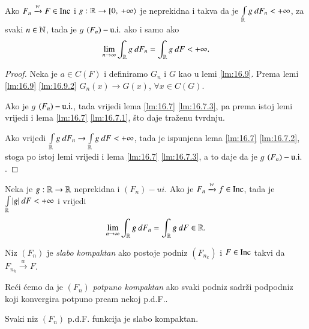 \begin{lm}  \label{lm:16.13}
    Ako $F_n \xrightarrow{w} F \in \mathrm{Inc}$ i $g: \mathbb{R} \to [ {0}, \: {+\infty} \rangle$ je neprekidna i takva da je $\int\limits_{\mathbb{R}} g \: d F_n < +\infty$, za svaki $n \in \mathbb{N}$, tada je $g$ $(F_n)-\mathrm{u.i.}$ ako i samo ako
    \begin{equation*}
        \lim\limits_{n \to \infty} \int_{\mathbb{R}} g \: d F_n = \int_{\mathbb{R}} g \: d F < +\infty.
    \end{equation*}
\end{lm}

\begin{proof}
    Neka je $a \in C(F)$ i definiramo $G_n$ i $G$ kao u lemi \ref{lm:16.9}.
    Prema lemi \ref{lm:16.9} \ref{lm:16.9.2} $G_n (x) \to G(x)$, $\forall x \in C(G)$.
    
    Ako je $g$ $(F_n)-\mathrm{u.i.}$, tada vrijedi lema \ref{lm:16.7} \ref{lm:16.7.3}, pa prema istoj lemi vrijedi i lema \ref{lm:16.7} \ref{lm:16.7.1}, \v sto daje tra\v zenu tvrdnju.

    Ako vrijedi $\int\limits_{\mathbb{R}} g \: d F_n \to \int\limits_{\mathbb{R}} g \: d F < +\infty$, tada je ispunjena lema \ref{lm:16.7} \ref{lm:16.7.2}, stoga po istoj lemi vrijedi i lema \ref{lm:16.7} \ref{lm:16.7.3}, a to daje da je $g$ $(F_n)-\mathrm{u.i.}$.
\end{proof}

\begin{kor} \label{kor:16.14}
    Neka je $g: \mathbb{R} \to \mathbb{R}$ neprekidna i $(F_n)-ui$.
    Ako je $F_n \xrightarrow{w} f \in \mathrm{Inc}$, tada je $\int\limits_{\mathbb{R}} |g| \: d F < +\infty$ i vrijedi
    \begin{equation*}
        \lim\limits_{n \to \infty} \int_{\mathbb{R}} g \: d F_n = \int_{\mathbb{R}} g \: d F \in \mathbb{R}.
    \end{equation*} 
\end{kor}

\begin{defn}    \label{defn:16.15}
    Niz $(F_n)$ je \emph{slabo kompaktan} ako postoje podniz $(F_{n_k})$ i $F \in \mathrm{Inc}$ takvi da $F_{n_k} \xrightarrow{w} F$.

    Re\' ci \' cemo da je $(F_n)$ \emph{potpuno kompaktan} ako svaki podniz sadr\v zi podpodniz koji konvergira potpuno pream nekoj p.d.F..
\end{defn}

\begin{tm}  \label{tm:16.16}
    Svaki niz $(F_n)$ p.d.F. funkcija je slabo kompaktan.
\end{tm}